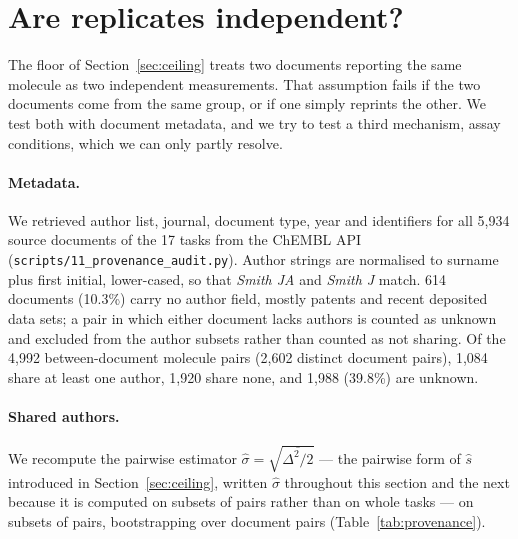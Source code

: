 \section{Are replicates independent?}\label{sec:provenance}

The floor of Section~\ref{sec:ceiling} treats two documents reporting the same molecule as two independent measurements. That assumption fails if the two documents come from the same group, or if one simply reprints the other. We test both with document metadata, and we try to test a third mechanism, assay conditions, which we can only partly resolve.

\paragraph{Metadata.} We retrieved author list, journal, document type, year and identifiers for all 5{,}934 source documents of the 17 tasks from the ChEMBL API (\texttt{scripts/11\_provenance\_audit.py}). Author strings are normalised to surname plus first initial, lower-cased, so that \emph{Smith JA} and \emph{Smith J} match. 614 documents (10.3\%) carry no author field, mostly patents and recent deposited data sets; a pair in which either document lacks authors is counted as unknown and excluded from the author subsets rather than counted as not sharing. Of the 4{,}992 between-document molecule pairs (2{,}602 distinct document pairs), 1{,}084 share at least one author, 1{,}920 share none, and 1{,}988 (39.8\%) are unknown.

\paragraph{Shared authors.} We recompute the pairwise estimator $\hat\sigma=\sqrt{\overline{\Delta^2/2}}$ --- the pairwise form of $\hat s$ introduced in Section~\ref{sec:ceiling}, written $\hat\sigma$ throughout this section and the next because it is computed on subsets of pairs rather than on whole tasks --- on subsets of pairs, bootstrapping over document pairs (Table~\ref{tab:provenance}).

